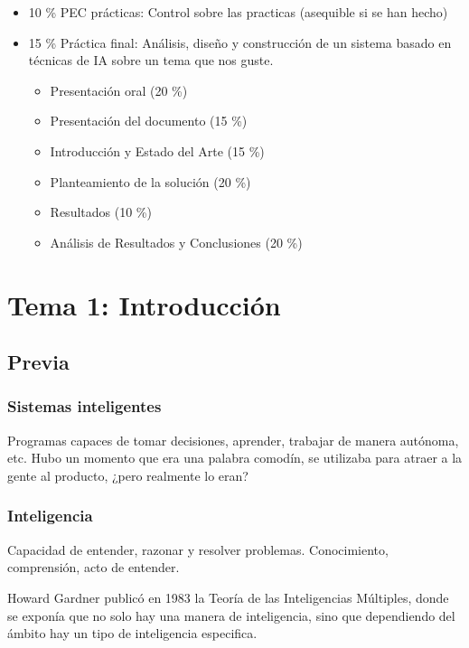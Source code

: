 \documentclass[12pt, twoside, openright]{report} %
\begin{document}
\begin{itemize}
\begin{itemize}
\begin{itemize}
		            \end{itemize}
		      \item 10 \% PEC prácticas: Control sobre las practicas (asequible si se han hecho)
		      \item 15 \% Práctica final: Análisis, diseño y construcción de un sistema basado en técnicas de IA sobre un tema que nos guste.
		            \begin{itemize}
			            \item Presentación oral (20 \%)
			            \item Presentación del documento (15 \%)
			            \item Introducción y Estado del Arte (15 \%)
			            \item Planteamiento de la solución (20 \%)
			            \item Resultados (10 \%)
			            \item Análisis de Resultados y Conclusiones (20 \%)
		            \end{itemize}
	      \end{itemize}

\end{itemize}

\chapter{Tema 1: Introducción}
\section{Previa}
\subsection{Sistemas inteligentes}
Programas capaces de tomar decisiones, aprender, trabajar de manera autónoma, etc. Hubo un momento que era una palabra comodín, se utilizaba para atraer a la gente al producto, ¿pero realmente lo eran?

\subsection{Inteligencia}
Capacidad de entender, razonar y resolver problemas. Conocimiento, comprensión, acto de entender.

Howard Gardner publicó en 1983 la Teoría de las Inteligencias Múltiples, donde se exponía que no solo hay una manera de inteligencia, sino que dependiendo del ámbito hay un tipo de inteligencia especifica.
\begin{figure}[H]
	{\def\svgwidth{.8\textwidth}
		}
\end{figure}
\end{document}
